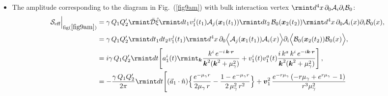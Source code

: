 \begin{itemize}
\item The amplitude corresponding to the diagram in Fig.~(\ref{fig9am}) with bulk interaction vertex $\rmint d^4 x\,\partial_0\mathcal{A}_i\partial_i\mathcal{B}_0$:
\begin{align}
    \begin{split}
   \mathcal{S}_{\text{eff}}\Big |_{{\text{fig}(\ref{fig9am})}}&=\gamma \,Q_1 Q_2'\rmint\Bar{\mathcal{D}}\Hat{\xi}\rmint dt_1v_1^j(t_1)\mathcal{A}_j(\boldsymbol{x}_1(t_1))\rmint dt_2\, \mathcal{B}_0(\boldsymbol{x}_2(t_2))\rmint d^4x\,\partial_0\mathcal{A}_i(x)\partial_i\mathcal{B}_0(x),\\ &=\gamma \,Q_1 Q_2'\rmint dt_1dt_2v_1^j(t_1)\rmint d^4x\,\partial_0\Big{\langle}\mathcal{A}_j(\boldsymbol{x}_1(t_1))\mathcal{A}_i(x)\Big{\rangle}\partial_i\Big{\langle}\mathcal{B}_0(\boldsymbol{x}_2(t_2))\mathcal{B}_0(x)\Big{\rangle},\\ &
=i\gamma\,Q_1 Q_2'\rmint dt \Bigg[a^{i}_{1}(t)\rmint_{\boldsymbol{k}}\frac{k^i\,e^{-i\,\boldsymbol{k}\cdot\boldsymbol{r}}}{\boldsymbol{k}^2(\boldsymbol{k}^2+\mu_{\gamma}^2)}+v_1^{i}(t)v_{1}^{a}(t)\frac{i\,k^a\,k^i\,e^{-i\boldsymbol{k}\cdot\boldsymbol{r}}}{\boldsymbol{k}^2(\boldsymbol{k}^2+\mu_{\gamma}^2)}\Bigg]\,,\\ &
=-\frac{\gamma\,Q_1 Q_2'}{2\pi}\rmint dt \Bigg[(\Vec{a}_1\cdot \Hat{n})\Big\{\frac{  e^{-\mu_{\gamma} r}}{2 \mu_{\gamma} \,r}-\frac{1 -  e^{-\mu_{\gamma} r}}{2\, \mu_{\gamma}^2\, r^2}\Big\}+\boldsymbol{v}_1^2 \,\frac{e^{-r \mu _{\gamma }} \left(-r \mu _{\gamma }+e^{r \mu _{\gamma }}-1\right)}{  r^3 \mu _{\gamma }^2}\\ &

\end{split}
\end{align}
\end{itemize}
